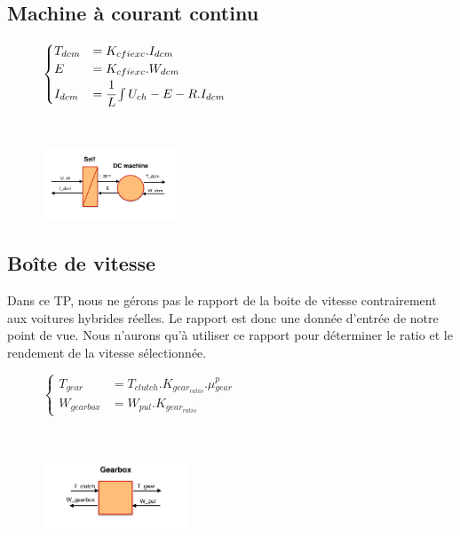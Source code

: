 \subsection{Machine à courant continu}
\vspace{-10px}
\begin{figure}[ht]
\centering
\begin{minipage}{.5\textwidth}  
\centering
$\begin{cases}
	 T_{dcm} &= K_{cfiexc}.I_{dcm}\\
	E &= K_{cfiexc}.W_{dcm}\\
	I_{dcm} &= \cfrac{1}{L}\int{U_{ch}-E-R.I_{dcm}}	
\end{cases}$
\end{minipage}~
\begin{minipage}{.5\textwidth}
  \centering
\includegraphics[height=80px]{images/MCC.png}
\end{minipage}
\end{figure}
\FloatBarrier
\vspace{-20px}

\subsection{Boîte de vitesse}
Dans ce TP, nous ne gérons pas le rapport de la boite de vitesse contrairement aux voitures hybrides réelles. Le rapport est donc une donnée d'entrée de notre point de vue. Nous n'aurons qu'à utiliser ce rapport pour déterminer le ratio et le rendement de la vitesse sélectionnée. 
\vspace{-10px}
\begin{figure}[ht]
\centering
\begin{minipage}{.5\textwidth}  
\centering
$\begin{cases}
	 T_{gear} &= T_{clutch}.K_{gear_{ratio}}.\mu{}_{gear}^{p} \\
	W_{gearbox} &= W_{pul}.K_{gear_{ratio}}
\end{cases}$
\end{minipage}~
\begin{minipage}{.5\textwidth}
  \centering
\includegraphics[height=80px]{images/Gearbox.png}
\end{minipage}
\end{figure}
\FloatBarrier
\vspace{-20px}

